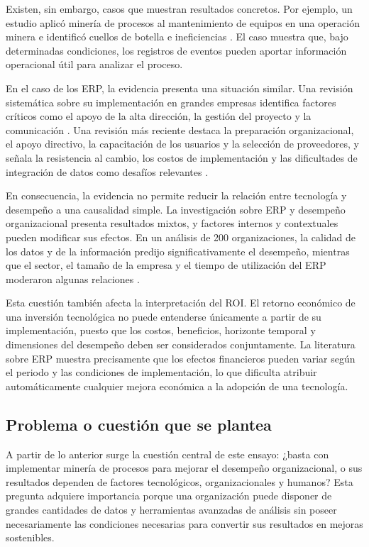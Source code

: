 \documentclass{article}
\begin{document}
    Existen, sin embargo, casos que muestran resultados concretos. Por ejemplo, un estudio aplicó minería de procesos al mantenimiento de equipos en una operación minera e identificó cuellos de botella e ineficiencias \cite{miningindustry2023}. El caso muestra que, bajo determinadas condiciones, los registros de eventos pueden aportar información operacional útil para analizar el proceso.

    En el caso de los ERP, la evidencia presenta una situación similar. Una revisión sistemática sobre su implementación en grandes empresas identifica factores críticos como el apoyo de la alta dirección, la gestión del proyecto y la comunicación \cite{alimiller2017erp}. Una revisión más reciente destaca la preparación organizacional, el apoyo directivo, la capacitación de los usuarios y la selección de proveedores, y señala la resistencia al cambio, los costos de implementación y las dificultades de integración de datos como desafíos relevantes \cite{talo2025erp}.

    En consecuencia, la evidencia no permite reducir la relación entre tecnología y desempeño a una causalidad simple. La investigación sobre ERP y desempeño organizacional presenta resultados mixtos, y factores internos y contextuales pueden modificar sus efectos. En un análisis de 200 organizaciones, la calidad de los datos y de la información predijo significativamente el desempeño, mientras que el sector, el tamaño de la empresa y el tiempo de utilización del ERP moderaron algunas relaciones \cite{erpimpact2024}.

    Esta cuestión también afecta la interpretación del ROI. El retorno económico de una inversión tecnológica no puede entenderse únicamente a partir de su implementación, puesto que los costos, beneficios, horizonte temporal y dimensiones del desempeño deben ser considerados conjuntamente. La literatura sobre ERP muestra precisamente que los efectos financieros pueden variar según el periodo y las condiciones de implementación, lo que dificulta atribuir automáticamente cualquier mejora económica a la adopción de una tecnología.

    \subsection{Problema o cuestión que se plantea}

    A partir de lo anterior surge la cuestión central de este ensayo: ¿basta con implementar minería de procesos para mejorar el desempeño organizacional, o sus resultados dependen de factores tecnológicos, organizacionales y humanos? Esta pregunta adquiere importancia porque una organización puede disponer de grandes cantidades de datos y herramientas avanzadas de análisis sin poseer necesariamente las condiciones necesarias para convertir sus resultados en mejoras sostenibles.
\end{document}
